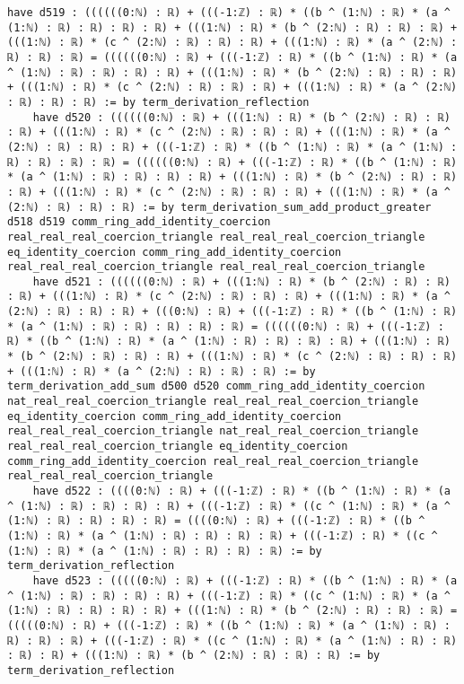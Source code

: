 \documentclass{article}
\begin{document}
\begin{tcolorbox}[colback=white!10, width=\linewidth]
\begin{lstlisting}[language=Lean4]
    have d519 : ((((((0:ℕ) : ℝ) + (((-1:ℤ) : ℝ) * ((b ^ (1:ℕ) : ℝ) * (a ^ (1:ℕ) : ℝ) : ℝ) : ℝ) : ℝ) + (((1:ℕ) : ℝ) * (b ^ (2:ℕ) : ℝ) : ℝ) : ℝ) + (((1:ℕ) : ℝ) * (c ^ (2:ℕ) : ℝ) : ℝ) : ℝ) + (((1:ℕ) : ℝ) * (a ^ (2:ℕ) : ℝ) : ℝ) : ℝ) = ((((((0:ℕ) : ℝ) + (((-1:ℤ) : ℝ) * ((b ^ (1:ℕ) : ℝ) * (a ^ (1:ℕ) : ℝ) : ℝ) : ℝ) : ℝ) + (((1:ℕ) : ℝ) * (b ^ (2:ℕ) : ℝ) : ℝ) : ℝ) + (((1:ℕ) : ℝ) * (c ^ (2:ℕ) : ℝ) : ℝ) : ℝ) + (((1:ℕ) : ℝ) * (a ^ (2:ℕ) : ℝ) : ℝ) : ℝ) := by term_derivation_reflection
    have d520 : ((((((0:ℕ) : ℝ) + (((1:ℕ) : ℝ) * (b ^ (2:ℕ) : ℝ) : ℝ) : ℝ) + (((1:ℕ) : ℝ) * (c ^ (2:ℕ) : ℝ) : ℝ) : ℝ) + (((1:ℕ) : ℝ) * (a ^ (2:ℕ) : ℝ) : ℝ) : ℝ) + (((-1:ℤ) : ℝ) * ((b ^ (1:ℕ) : ℝ) * (a ^ (1:ℕ) : ℝ) : ℝ) : ℝ) : ℝ) = ((((((0:ℕ) : ℝ) + (((-1:ℤ) : ℝ) * ((b ^ (1:ℕ) : ℝ) * (a ^ (1:ℕ) : ℝ) : ℝ) : ℝ) : ℝ) + (((1:ℕ) : ℝ) * (b ^ (2:ℕ) : ℝ) : ℝ) : ℝ) + (((1:ℕ) : ℝ) * (c ^ (2:ℕ) : ℝ) : ℝ) : ℝ) + (((1:ℕ) : ℝ) * (a ^ (2:ℕ) : ℝ) : ℝ) : ℝ) := by term_derivation_sum_add_product_greater d518 d519 comm_ring_add_identity_coercion real_real_real_coercion_triangle real_real_real_coercion_triangle eq_identity_coercion comm_ring_add_identity_coercion real_real_real_coercion_triangle real_real_real_coercion_triangle
    have d521 : ((((((0:ℕ) : ℝ) + (((1:ℕ) : ℝ) * (b ^ (2:ℕ) : ℝ) : ℝ) : ℝ) + (((1:ℕ) : ℝ) * (c ^ (2:ℕ) : ℝ) : ℝ) : ℝ) + (((1:ℕ) : ℝ) * (a ^ (2:ℕ) : ℝ) : ℝ) : ℝ) + (((0:ℕ) : ℝ) + (((-1:ℤ) : ℝ) * ((b ^ (1:ℕ) : ℝ) * (a ^ (1:ℕ) : ℝ) : ℝ) : ℝ) : ℝ) : ℝ) = ((((((0:ℕ) : ℝ) + (((-1:ℤ) : ℝ) * ((b ^ (1:ℕ) : ℝ) * (a ^ (1:ℕ) : ℝ) : ℝ) : ℝ) : ℝ) + (((1:ℕ) : ℝ) * (b ^ (2:ℕ) : ℝ) : ℝ) : ℝ) + (((1:ℕ) : ℝ) * (c ^ (2:ℕ) : ℝ) : ℝ) : ℝ) + (((1:ℕ) : ℝ) * (a ^ (2:ℕ) : ℝ) : ℝ) : ℝ) := by term_derivation_add_sum d500 d520 comm_ring_add_identity_coercion nat_real_real_coercion_triangle real_real_real_coercion_triangle eq_identity_coercion comm_ring_add_identity_coercion real_real_real_coercion_triangle nat_real_real_coercion_triangle real_real_real_coercion_triangle eq_identity_coercion comm_ring_add_identity_coercion real_real_real_coercion_triangle real_real_real_coercion_triangle
    have d522 : ((((0:ℕ) : ℝ) + (((-1:ℤ) : ℝ) * ((b ^ (1:ℕ) : ℝ) * (a ^ (1:ℕ) : ℝ) : ℝ) : ℝ) : ℝ) + (((-1:ℤ) : ℝ) * ((c ^ (1:ℕ) : ℝ) * (a ^ (1:ℕ) : ℝ) : ℝ) : ℝ) : ℝ) = ((((0:ℕ) : ℝ) + (((-1:ℤ) : ℝ) * ((b ^ (1:ℕ) : ℝ) * (a ^ (1:ℕ) : ℝ) : ℝ) : ℝ) : ℝ) + (((-1:ℤ) : ℝ) * ((c ^ (1:ℕ) : ℝ) * (a ^ (1:ℕ) : ℝ) : ℝ) : ℝ) : ℝ) := by term_derivation_reflection
    have d523 : (((((0:ℕ) : ℝ) + (((-1:ℤ) : ℝ) * ((b ^ (1:ℕ) : ℝ) * (a ^ (1:ℕ) : ℝ) : ℝ) : ℝ) : ℝ) + (((-1:ℤ) : ℝ) * ((c ^ (1:ℕ) : ℝ) * (a ^ (1:ℕ) : ℝ) : ℝ) : ℝ) : ℝ) + (((1:ℕ) : ℝ) * (b ^ (2:ℕ) : ℝ) : ℝ) : ℝ) = (((((0:ℕ) : ℝ) + (((-1:ℤ) : ℝ) * ((b ^ (1:ℕ) : ℝ) * (a ^ (1:ℕ) : ℝ) : ℝ) : ℝ) : ℝ) + (((-1:ℤ) : ℝ) * ((c ^ (1:ℕ) : ℝ) * (a ^ (1:ℕ) : ℝ) : ℝ) : ℝ) : ℝ) + (((1:ℕ) : ℝ) * (b ^ (2:ℕ) : ℝ) : ℝ) : ℝ) := by term_derivation_reflection

\end{lstlisting}
\end{tcolorbox}
\end{document}
